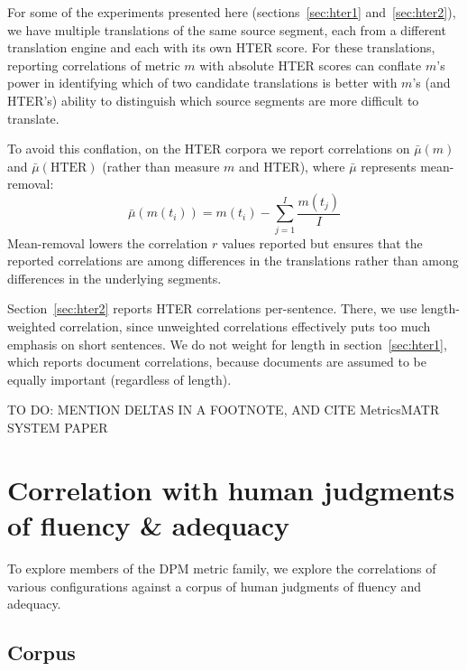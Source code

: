 \documentclass{kluwer}    %
\begin{document}
\begin{article}
For some of the experiments presented here (sections~\ref{sec:hter1}
and~\ref{sec:hter2}), we have multiple translations of the same source
segment, each from a different translation engine and each with its
own HTER score.  For these translations, reporting correlations of
metric $m$ with absolute HTER scores can conflate $m$'s power in
identifying which of two candidate translations is better with $m$'s
(and HTER's) ability to distinguish which source segments are
more difficult to translate. 

To avoid this conflation, on the HTER corpora we report correlations
on $\bar{\mu}(m)$
and $\bar{\mu}(\textrm{HTER})$ (rather than measure $m$ and HTER), where
$\bar{\mu}$ represents mean-removal:
\begin{equation}
  \label{eq:meansub}
  \bar{\mu}(m(t_i)) = m(t_i) - \sum_{j=1}^I\frac{m(t_j)}{I}
\end{equation}
Mean-removal lowers the correlation $r$ values reported but ensures
that the reported correlations are among differences in the
translations rather than among differences in the underlying segments.

Section~\ref{sec:hter2} reports HTER correlations per-sentence. There,
we use length-weighted correlation, since unweighted correlations
effectively puts too much emphasis on short sentences.  We do not
weight for length in section~\ref{sec:hter1}, which reports document
correlations, because documents are assumed to be equally important
(regardless of length).

TO DO: MENTION DELTAS IN A FOOTNOTE, AND CITE MetricsMATR SYSTEM PAPER


\section{Correlation with human judgments of fluency \& adequacy}
\label{sec:faexpts}

To explore members of the DPM metric family, we explore the
correlations of various configurations against a corpus of human
judgments of fluency and adequacy.


\subsection{Corpus}


\end{article}
\end{document}
